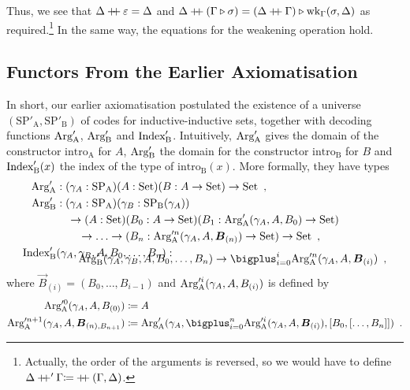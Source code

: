 \documentclass[orivec,envcountsame, ,envcountsect]{llncs}
\begin{document}
Thus, we see that $\Delta \mathbin{+\mkern-6mu+} \varepsilon = \Delta$ and $\Delta
\mathbin{+\mkern-6mu+} (\Gamma \triangleright \sigma) = (\Delta
  \mathbin{+\mkern-6mu+} \Gamma) \triangleright \text{wk}_{\Gamma}(\sigma, \Delta)$ as
required.\footnote{Actually, the order of the arguments is reversed,
  so we would have to define \\$\Delta \mathbin{+\mkern-6mu+}' \Gamma {\coloneqq}
  \mathbin{+\mkern-6mu+}(\Gamma, \Delta)$.} In the same way, the equations for
the weakening operation hold.


\subsection{Functors From the Earlier Axiomatisation} %
\label{sec:functors-CSL-article}

In short, our earlier
axiomatisation\cite{nordvallforsbergSetzer2010indind} postulated the
existence of a universe $(\text{SP}'_{\text{A}},
\text{SP}'_{\text{B}})$ of codes for inductive-inductive sets,
together with decoding functions $\text{Arg}_{\text{A}}'$, $\text{Arg}_{\text{B}}'$ and
$\text{Index}'_{\text{B}}$. Intuitively, $\text{Arg}_{\text{A}}'$ gives the domain of the
constructor $\text{intro}_{\text{A}}$ for $A$, $\text{Arg}_{\text{B}}'$ the domain
for the constructor $\text{intro}_{\text{B}}$ for $B$ and
$\text{Index}'_{\text{B}}(x)$ the index of the type of $\text{intro}_{\text{B}}(x)$. More formally, they have types
\begin{align*}
\CSLArgA &: (\gamma_A : \text{SP}_{\text{A}})(A : \Set)(B : A \to \Set) \to \Set \enspace ,\\
\CSLArgB &: (\gamma_A : \text{SP}_{\text{A}})(\gamma_B : \text{SP}_{\text{B}}(\gamma_A)) \\
       & \quad \to (A : \Set)(B_0 : A \to \Set)(B_1 : \CSLArgA(\gamma_A, A, B_0) \to \Set) \\
       & \qquad \to \ldots \to (B_n : \CSLArgA^n(\gamma_A, A, \vec{B}_{(n)}) \to \Set) \to \Set \enspace , \\
\CSLIndex&(\gamma_A, \gamma_B, A, B_0, \ldots, B_n) : \\ \noalign{\vskip -4mm}
              &  \qquad \CSLArgB(\gamma_A, \gamma_B, A, B_0, \ldots, B_n) \to \bigplus_{i = 0}^i \CSLArgA^n(\gamma_A, A, \vec{B}_{(i)}) \enspace ,
\end{align*} 
where $\vec{B}_{(i)} = (B_0, \ldots, B_{i - 1})$ and $\text{Arg}_{\text{A}}'^i(\gamma_A, A, B_{(i)})$ is defined by
\begin{align*}
  \CSLArgA^0(\gamma_A, A, B_{(0)}) &\coloneqq A \\
  \CSLArgA^{n + 1}(\gamma_A, A, \vec{B}_{(n), B_{n + 1}}) &\coloneqq \CSLArgA(\gamma_A, \bigplus_{i = 0}^n \CSLArgA^i(\gamma_A, A, \vec{B}_{(i)}), \coprodmorph{B_0}{\coprodmorph{\ldots}{B_n}}) \enspace .
\end{align*}
\end{document}
